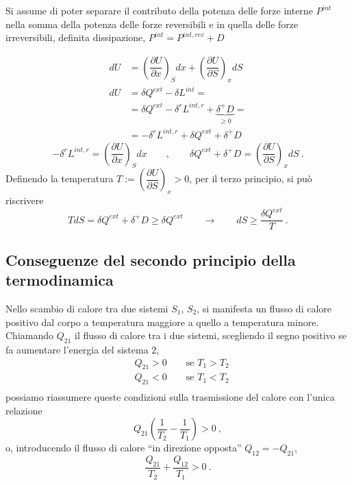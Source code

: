 Si assume di poter separare il contributo della potenza delle forze interne $P^{int}$ nella somma della potenza delle forze reversibili e in quella delle forze irreversibili, definita dissipazione, $P^{int} = P^{int,rev} + D$

\begin{equation}
\begin{aligned}
  d U & = \left(\dfrac{\partial U}{\partial x}\right)_S dx + \left(\dfrac{\partial U}{\partial S}\right)_x dS \\
  d U & = \delta Q^{ext} - \delta L^{int} = \\
      & = \delta Q^{ext} - \delta^r L^{int,r} + \underbrace{\delta^+ D}_{\ge 0} = \\
      & = -\delta^r L^{int,r} + \delta Q^{ext} + \delta^+ D 
\end{aligned}
\end{equation}
\begin{equation}
  - \delta^r L^{int,r} =  \left(\dfrac{\partial U}{\partial x}\right)_S dx
\qquad , \qquad
  \delta Q^{ext} + \delta^+ D = \left(\dfrac{\partial U}{\partial S}\right)_x dS \ .
\end{equation}
Definendo la temperatura $T := \left(\dfrac{\partial U}{\partial S}\right)_x > 0$, per il terzo principio, si può riscrivere 
\begin{equation}
  T dS = \delta Q^{ext} + \delta^+ D \ge \delta Q^{ext} \qquad \rightarrow \qquad dS \ge \dfrac{\delta Q^{ext}}{T} \ .
\end{equation}

\subsection{Conseguenze del secondo principio della termodinamica}
Nello scambio di calore tra due sistemi $S_1$, $S_2$, si manifesta un flusso di calore positivo dal corpo a temperatura maggiore a quello a temperatura minore. Chiamando $Q_{21}$ il flusso di calore tra i due sistemi, scegliendo il segno positivo se fa aumentare l'energia del sistema $2$,
\begin{equation}
\begin{aligned}
    &  Q_{21} > 0 \qquad \text{se $T_1 > T_2$} \\ 
    &  Q_{21} < 0 \qquad \text{se $T_1 < T_2$} \\ 
\end{aligned}
\end{equation}
possiamo riassumere queste condizioni sulla trasmissione del calore con l'unica relazione
\begin{equation}
    Q_{21} \left( \dfrac{1}{T_2} - \dfrac{1}{T_1} \right) > 0 \ ,
\end{equation}
o, introducendo il flusso di calore ``in direzione opposta'' $Q_{12} = -Q_{21}$,
\begin{equation}
    \dfrac{Q_{21}}{T_2} + \dfrac{Q_{12}}{T_1} > 0 \ .
\end{equation}

